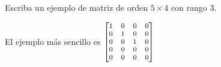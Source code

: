 \begin{exercise}
  Escriba un ejemplo de matriz de orden $5\times4$ con rango 3.
  \begin{solution}[]
    El ejemplo más sencillo es\;
    \begin{math}
      \footnotesize
      \begin{bmatrix}
        1&0&0&0\\
        0&1&0&0\\
        0&0&1&0\\
        0&0&0&0\\
        0&0&0&0\\
      \end{bmatrix}
    \end{math}
  \end{solution}
\end{exercise}

